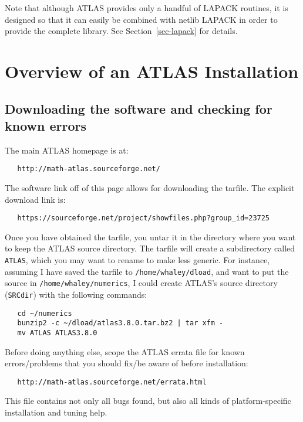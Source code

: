 \documentclass[11pt]{article}
\begin{document}
Note that although ATLAS provides only a handful of LAPACK routines, it is
designed so that it can easily be combined with netlib LAPACK in order
to provide the complete library.  See Section~\ref{sec-lapack} for details.

\section{Overview of an ATLAS Installation}
\label{sec-install}

\subsection{Downloading the software and checking for known errors}
The main ATLAS homepage is at:
\vspace*{-0.1in}
\begin{verbatim}
   http://math-atlas.sourceforge.net/
\end{verbatim}

The software link off of this page allows for downloading the tarfile.
The explicit download link is:
\vspace*{-0.1in}
\begin{verbatim}
   https://sourceforge.net/project/showfiles.php?group_id=23725
\end{verbatim}

Once you have obtained the tarfile, you untar it in the directory where
you want to keep the ATLAS source directory.  The tarfile will create
a subdirectory called {\tt ATLAS}, which you may want to rename to make
less generic.  For instance, assuming I have saved the tarfile to
{\tt /home/whaley/dload}, and want to put the source in 
{\tt /home/whaley/numerics}, I could create ATLAS's source directory
({\tt SRCdir}) with the following commands:
\begin{verbatim}
   cd ~/numerics
   bunzip2 -c ~/dload/atlas3.8.0.tar.bz2 | tar xfm -
   mv ATLAS ATLAS3.8.0
\end{verbatim}

Before doing anything else, scope the ATLAS errata file for known 
errors/problems that you should fix/be aware of before installation:
\vspace*{-0.1in}
\begin{verbatim}
   http://math-atlas.sourceforge.net/errata.html
\end{verbatim}

This file contains not only all bugs found, but also all kinds
of platform-specific installation and tuning help.
\end{document}
